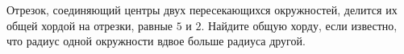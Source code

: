 \begin{ex}
	\begin{condition}
		Отрезок, соединяющий центры двух пересекающихся окружностей, делится их общей хордой на отрезки, равные \( 5 \)	и \( 2 \). Найдите общую хорду, если известно, что радиус одной	окружности вдвое больше радиуса другой.
	\end{condition}
\end{ex}